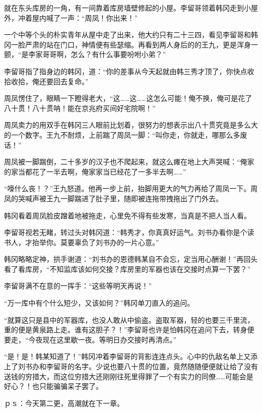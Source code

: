 就在东头库房的一角，有一间靠着库房墙壁修起的小屋。李留哥领着韩冈走到小屋外，冲着屋内喊了一声：“周凤！你出来！”

一个中等个头的朴实青年从屋中走了出来，他大约只有二十三四，看见李留哥和韩冈一脸严肃的站在门口，神情便有些瑟缩。再看到两人身后的的王九，更是浑身一颤，“是李家哥哥啊，怎么？有什么事要吩咐小弟？”

李留哥指了指身边的韩冈，道：“你的差事从今天起就由韩三秀才顶了，你快点收拾收拾，俺还要回去复命。”

周凤愣住了，眼睛一下瞪得老大，“这……这……这怎么可能！俺不换，俺可是花了八十贯！八十贯呐！能在京兆府买间好宅院啊！”

周凤卖力的用双手在韩冈三人眼前比划着，很努力的想表示出八十贯究竟是多么大的一个数字。王九不耐烦，上前踹了周凤一脚：“叫你走，你就走，哪那么多废话！”

周凤被一脚踹倒，二十多岁的汉子也不爬起来，就这么瘫在地上大声哭喊：“俺家的家当都花了一半去啊，俺家家当已经花了一多半去啊……”

“嚎什么丧！？”王九怒道。他再一步上前，抬脚用更大的气力再给了周凤一下。周凤的哭喊声被王九一脚踹进了肚子里，随即被连拖带拽拖出了门外去。

韩冈看着周凤脸皮蹭着地被拖走，心里免不得有些发寒，当真是不把人当人看。

李留哥视若无睹，转过头对韩冈道：“韩秀才，你真真好运气。刘书办看你是个读书人，才抬举你。莫要辜负了刘书办的一片心意。”

韩冈略略定神，拱手谢道：“刘书办的恩德韩某自不会忘，定当用心酬谢！”再回头看了看库房，“不知监库该如何交接？库房里的军器也该在交接时点算一下罢？”

李留哥满不在意的一挥手：“这些等明天再说！”

“万一库中有个什么短少，又该如何？”韩冈单刀直入的追问。

“就算这只是县中的军器库，也没人敢从中偷盗。盗取军器，轻的也要三千里流，重的便是黄泉路上走。谁有这胆子？！”李留哥也许是怕韩冈在追问下去，转身便要走，“今夜现在这里歇一夜。等明日办交接时再清点。”

“是！是！韩某知道了！”韩冈冲着李留哥的背影连连点头。心中的仇敌名单上又添上了刘书办和李留哥的名字。少说也要八十贯的位置，竟然随随便便就让给了没有送钱的穷措大，而这位穷措大还刚刚往死里得罪了一个有实力的同僚……可能会是好心？！也只能骗骗呆子罢了。

ｐｓ：今天第二更，高潮就在下一章。

